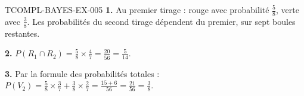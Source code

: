 \begin{corrige}{TCOMPL-BAYES-EX-005}
\textbf{1.} Au premier tirage : rouge avec probabilité $\tfrac58$, verte avec
$\tfrac38$. Les probabilités du second tirage dépendent du premier, sur sept
boules restantes.

\textbf{2.} $P(R_1\cap R_2)=\tfrac58\times\tfrac47=\tfrac{20}{56}
=\tfrac{5}{14}$.

\textbf{3.} Par la formule des probabilités totales :
$P(V_2)=\tfrac58\times\tfrac37+\tfrac38\times\tfrac27
=\tfrac{15+6}{56}=\tfrac{21}{56}=\tfrac38$.
\end{corrige}
